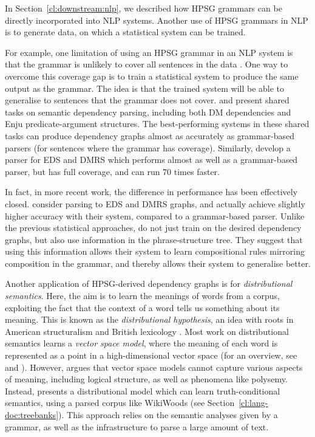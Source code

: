 \documentclass[output=paper,nonflat]{langsci/langscibook}
\begin{document}
In Section~\ref{cl:downstream:nlp},
we described how HPSG grammars can be directly incorporated into NLP systems.
Another use of HPSG grammars in NLP
is to generate data, on which a statistical system can be trained.

For example, one limitation of using an HPSG grammar in an NLP system
is that the grammar is unlikely to cover all sentences in the data \citep{flickinger2012deepbank}.
One way to overcome this coverage gap
is to train a statistical system to produce the same output as the grammar.
The idea is that the trained system will be able to generalise to sentences that the grammar does not cover.
\citet{oepen2014semeval} and \citet{oepen2015semeval}
present shared tasks on semantic dependency parsing,
including both DM dependencies and Enju predicate-argument structures.
The best-performing systems in these shared tasks
can produce dependency graphs almost as accurately as grammar-based parsers
(for sentences where the grammar has coverage).
Similarly, \citet{buys2017parse} develop a parser for EDS and DMRS
which performs almost as well as a grammar-based parser,
but has full coverage, and can run 70 times faster.

In fact, in more recent work, the difference in performance has been effectively closed.
\citet{chen2018parse} consider parsing to EDS and DMRS graphs,
and actually achieve slightly higher accuracy with their system,
compared to a grammar-based parser.
Unlike the previous statistical approaches,
\citeauthor{chen2018parse} do not just train on the desired dependency graphs,
but also use information in the phrase-structure tree.
They suggest that using this information allows their system
to learn compositional rules mirroring composition in the grammar,
and thereby allows their system to generalise better.

Another application of HPSG-derived dependency graphs
is for \textit{distributional semantics}.
Here, the aim is to learn the meanings of words from a corpus,
exploiting the fact that the context of a word tells us something about its meaning.
This is known as the \textit{distributional hypothesis},
an idea with roots in American structuralism \citep{harris1954distribution}
and British lexicology \citep{firth1951collocation,firth1957company}.
Most work on distributional semantics learns a \textit{vector space model},
where the meaning of each word is represented as a point in a high-dimensional vector space
(for an overview, see \citealt{erk2012vector} and \citealt{clark2015vector}).
However, \citet{emerson2018functional} argues that
vector space models cannot capture various aspects of meaning,
including logical structure, as well as phenomena like polysemy.
Instead, \citeauthor{emerson2018functional} presents a distributional model
which can learn truth-conditional semantics,
using a parsed corpus like WikiWoods (see Section~\ref{cl:lang-doc:treebanks}).
This approach relies on the semantic analyses given by a grammar,
as well as the infrastructure to parse a large amount of text.
\end{document}
